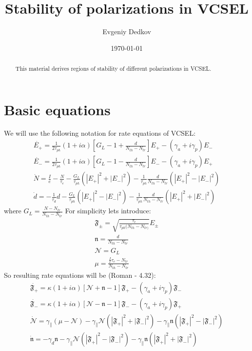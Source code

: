 \documentclass[12pt, notitlepage]{report}
\title{Stability of polarizations in VCSEL}
\author{Evgeniy Dedkov}
\date{\today}
\begin{document}
	
	\newcommand\scalemath[2]{\scalebox{#1}{\mbox{\ensuremath{\displaystyle #2}}}}
	\newcommand{\F}{\boldsymbol{\mathfrak{F}}}
	\newcommand{\n}{\boldsymbol{\mathfrak{n}}}
	\newcommand{\N}{\boldsymbol{\mathcal{N}}}
	\newcommand{\Q}{\mathcal{Q}}
	\newcommand{\gp}{\gamma_{\parallel}}
	
	\maketitle
	\thispagestyle{empty}
	
	\begin{abstract}
		This material derives regions of stability of different polarizations in VCSEL.
	\end{abstract}
	
	\section{Basic equations}
	We will use the following notation for rate equations of VCSEL:
	\begin{gather}
		\dot{E_+} = \frac{1}{2\tau_{ph}}(1+i\alpha)\left[G_L - 1+ \frac{d}{N_{th} - N_{tr}}\right] E_+ - (\gamma_a + i\gamma_p) E_- \\
		\dot{E_-} = \frac{1}{2\tau_{ph}}(1+i\alpha)\left[G_L - 1- \frac{d}{N_{th} - N_{tr}}\right] E_- - (\gamma_a + i\gamma_p) E_+ \\
		\dot{N} = \frac{I}{e} - \frac{N}{\tau_e} - \frac{G_L}{\tau_{ph}}(|E_+|^2+|E_-|^2) - \frac{1}{\tau_{ph}}\frac{d}{N_{th} - N_{tr}}(|E_+|^2 - |E_-|^2)\\
		\dot{d} = -\frac{1}{\tau_d} d -  \frac{G_L}{\tau_{ph}}(|E_+|^2-|E_-|^2) - \frac{1}{\tau_{ph}}\frac{d}{N_{th} - N_{tr}}(|E_+|^2+|E_-|^2)
	\end{gather}
	where $G_L = \frac{N - N_{tr}}{N_{th} - N_{tr}}$
	For simplicity lets introduce:
	\begin{gather}
		\F_\pm = \sqrt{\frac{\tau_{e}}{\tau_{ph}(N_{th} - N_{tr)}}}E_\pm \\
		\n = \frac{d}{N_{th} - N_{tr}} \\
		\N = G_L \\
		\mu = \frac{\frac{I}{e} \tau_e - N_{tr}}{N_{th} - N_{tr}}
	\end{gather}
	So resulting rate equations will be (Roman - 4.32):
	\begin{gather}
		\label{main_rate1}
		\dot{\F_+} = \kappa(1+i\alpha)\left[\N + \n - 1\right] \F_+ - (\gamma_a + i\gamma_p) \F_- \\
		\dot{\F_-} = \kappa(1+i\alpha)\left[\N - \n - 1\right] \F_- - (\gamma_a + i\gamma_p) \F_+ \\
		\dot{\N} = \gp\left(\mu-\N\right) - \gp\N(|\F_+|^2+|\F_-|^2) - \gp\n(|\F_+|^2 - |\F_-|^2) \\
		\label{main_rate4}
		\dot{\n} = -\gamma_d \n - \gp\N(|\F_+|^2-|\F_-|^2) - \gp\n(|\F_+|^2+|\F_-|^2)
	\end{gather}
	
\end{document}
